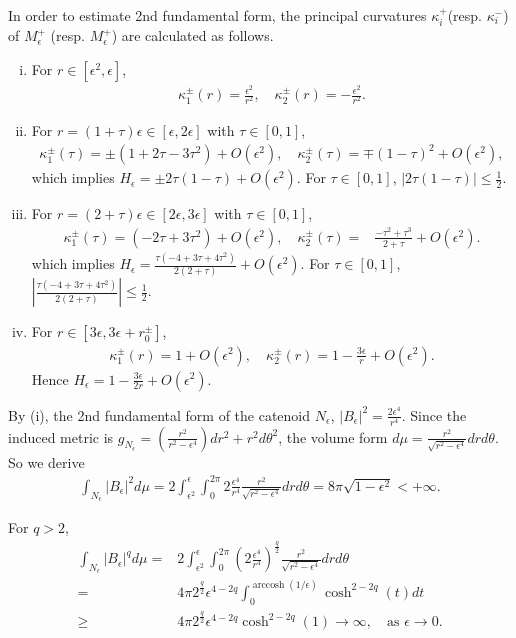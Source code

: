 \documentclass{amsart}
\numberwithin{equation}{section}
\theoremstyle{remark}
\renewcommand{\(}{\left(}
\renewcommand{\)}{\right)}
\renewcommand{\~}{\tilde}
\renewcommand{\-}{\overline}
\newcommand{\e}{\epsilon}
\renewcommand{\k}{\kappa}
\renewcommand{\t}{\theta}
\newcommand{\ra}{\rightarrow}
\begin{document}
In order to estimate 2nd fundamental form, the principal curvatures $\k_i^{+}$(resp. $\k_i^{-}$) of $M_\e^{+}$ (resp. $M_\e^{+}$) are calculated as follows.
\begin{enumerate}[(i)]
	\item For $r \in [\e^2,\e]$,
	\begin{align*}
	\k_1^{\pm}(r)=\frac{\e^2}{r^2}, \quad \k_2^{\pm}(r)=-\frac{\e^2}{r^2}.
	\end{align*}
	
	\item For $r=(1+\tau)\e \in [\e,2\e]$ with $\tau \in [0,1]$,
	\begin{align*}
	\k_1^{\pm}(\tau)=\pm (1+2\tau-3\tau^2)+O(\e^2),\quad \k_2^{\pm}(\tau)=\mp(1-\tau)^2+O(\e^2),
	\end{align*}
	which implies $H_\e=\pm 2\tau(1-\tau)+O(\e^2)$. For $\tau\in [0,1]$, $|2\tau(1-\tau)|\leq \frac{1}{2}$.
	
	\item For $r=(2+\tau)\e\in [2\e,3\e]$ with $\tau \in [0,1]$,
	\begin{align*}
	\k_1^{\pm}(\tau)=(-2\tau+3\tau^2)+O(\e^2), \quad \k_2^{\pm}(\tau)=&\frac{-\tau^2+\tau^3}{2+\tau}+O(\e^2).
	\end{align*}
	which implies  $H_\e=\frac{\tau(-4+3\tau+4\tau^2)}{2(2+\tau)}+O(\e^2)$.
	For $\tau\in [0,1]$,  $|\frac{\tau(-4+3\tau+4\tau^2)}{2(2+\tau)}|\leq \frac{1}{2}$.
	
	\item For $r\in [3\e,3\e+r_0^{\pm}]$,
	\begin{align*}
	\k_1^{\pm}(r)=1+O(\e^2), \quad \k_2^{\pm}(r)=1-\frac{3\e}{r}+O(\e^2).
	\end{align*}
	Hence $H_\e=1-\frac{3\e}{2r}+O(\e^2)$.
\end{enumerate}

By (i), the 2nd fundamental form of the catenoid $N_\e$, $|B_\e|^2=\frac{2\e^4}{r^4}$. Since the induced metric is $g_{N_\e}=\(\frac{r^2}{r^2-\e^4}\)dr^2+r^2 d\t^2$, the volume form $d\mu=\frac{r^2}{\sqrt{r^2-\e^4}} dr d\t$. So we derive
\begin{align*}
\int_{N_\e} |B_\e|^2 d\mu=2\int_{\e^2}^{\e} \int_0^{2\pi} 2\frac{\e^4}{r^4} \frac{r^2}{\sqrt{r^2-\e^4}} dr d\t=8\pi \sqrt{1-\e^2}<+\infty.
\end{align*}

For $q>2$,
\begin{align*}
\int_{N_\e} |B_\e|^q d\mu=&2\int_{\e^2}^{\e} \int_0^{2\pi} \(2\frac{\e^4}{r^4}\)^\frac{q}{2} \frac{r^2}{\sqrt{r^2-\e^4}} dr d\t \\
=&4\pi 2^\frac{q}{2} \e^{4-2q} \int_0^{\operatorname{arccosh}(1/\e)} \cosh^{2-2q}(t) dt \\
\geq &4\pi 2^\frac{q}{2} \e^{4-2q}  \cosh^{2-2q}(1) \ra \infty, \quad \text{as $\e\ra 0$}.
\end{align*}
\end{document}
